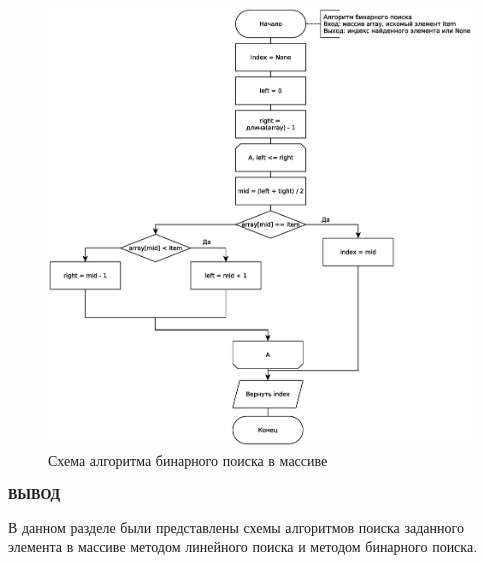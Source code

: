 \clearpage

\begin{figure}
	\centering
	\includegraphics[scale=0.5]{img/binary_search.eps}
	\caption{Схема алгоритма бинарного поиска в массиве}
	\label{fig:Binary}
\end{figure}

\clearpage

\textbf{ВЫВОД}

 В данном разделе были представлены схемы алгоритмов поиска заданного элемента в массиве методом линейного поиска и методом бинарного поиска.

\clearpage